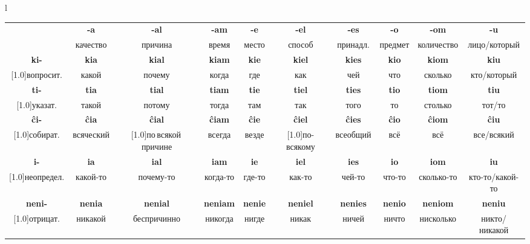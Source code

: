 \documentclass{article}
\def\b#1{\textbf{#1}}
\def\g{\cellcolor{gray!25}}
\begin{document}
\begin{center}
\begin{tabular}{l}
\begin{tabular}{|c|c|c|c|c|c|c|c|c|c|}
\hline
\g & \g\b{-a} & \g\b{-al} & \g\b{-am} & \g\b{-e} & \g\b{-el} & \g\b{-es} & \g\b{-o} & \g\b{-om} & \g\b{-u} \\
\g & \g качество & \g причина & \g время & \g место & \g способ & \g принадл. & \g предмет & \g количество & \g лицо/который \\
\hline
\g\b{ki-} & \b{kia} & \b{kial} & \b{kiam} & \b{kie} & \b{kiel} & \b{kies} & \b{kio} & \b{kiom} & \b{kiu} \\
\g\scalebox{.75}[1.0]{вопросит.} & какой & почему & когда & где & как & чей & что & сколько & кто/который \\
\hline
\g\b{ti-} & \b{tia} & \b{tial} & \b{tiam} & \b{tie} & \b{tiel} & \b{ties} & \b{tio} & \b{tiom} & \b{tiu} \\
\g\scalebox{.75}[1.0]{указат.} & такой & потому & тогда & там & так & того & то & столько & тот/то \\
\hline
\g\b{ĉi-} & \b{ĉia} & \b{ĉial} & \b{ĉiam} & \b{ĉie} & \b{ĉiel} & \b{ĉies} & \b{ĉio} & \b{ĉiom} & \b{ĉiu} \\
\g\scalebox{.75}[1.0]{собират.} & всяческий & \scalebox{.75}[1.0]{по\,всякой\,причине} & всегда & везде & \scalebox{.75}[1.0]{по-всякому} & всеобщий & всё & всё & все/всякий \\
\hline
\g\b{i-} & \b{ia} & \b{ial} & \b{iam} & \b{ie} & \b{iel} & \b{ies} & \b{io} & \b{iom} & \b{iu} \\
\g\scalebox{.75}[1.0]{неопредел.} & какой-то & почему-то & когда-то & где-то & как-то & чей-то & что-то & сколько-то & кто-то/какой-то \\
\hline
\g\b{neni-} & \b{nenia} & \b{nenial} & \b{neniam} & \b{nenie} & \b{neniel} & \b{nenies} & \b{nenio} & \b{neniom} & \b{neniu} \\
\g\scalebox{.75}[1.0]{отрицат.} & никакой & беспричинно & никогда & нигде & никак & ничей & ничто & нисколько & никто/никакой \\
\hline
\end{tabular}
\vspace{0.5em}\\


\end{tabular}
\end{center}
\end{document}
